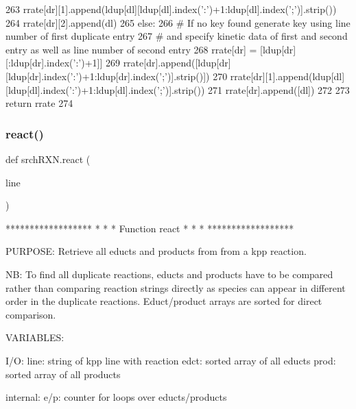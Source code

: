 \begin{DoxyCode}
263         rrate[dr][1].append(ldup[dl][ldup[dl].index(\textcolor{stringliteral}{':'})+1:ldup[dl].index(\textcolor{stringliteral}{';'})].strip())
264         rrate[dr][2].append(dl)
265     \textcolor{keywordflow}{else}:
266 \textcolor{comment}{# If no key found generate key using line number of first duplicate entry}
267 \textcolor{comment}{# and specify kinetic data of first and second entry as well as line number of second entry}
268         rrate[dr] = [ldup[dr][:ldup[dr].index(\textcolor{stringliteral}{':'})+1]]
269         rrate[dr].append([ldup[dr][ldup[dr].index(\textcolor{stringliteral}{':'})+1:ldup[dr].index(\textcolor{stringliteral}{';'})].strip()])
270         rrate[dr][1].append(ldup[dl][ldup[dl].index(\textcolor{stringliteral}{':'})+1:ldup[dl].index(\textcolor{stringliteral}{';'})].strip())
271         rrate[dr].append([dl])
272 
273     \textcolor{keywordflow}{return} rrate
274 
\end{DoxyCode}
\mbox{\label{namespacesrchRXN_a0d86abe53fd006f2f6ec9ea9e613a017}} 
\subsubsection{\texorpdfstring{react()}{react()}}
{\footnotesize\ttfamily def srch\+R\+X\+N.\+react (\begin{DoxyParamCaption}\item[{}]{line }\end{DoxyParamCaption})}

\begin{DoxyVerb}******************
*                *
* Function react *
*                *
******************

PURPOSE:
    Retrieve all educts and products from from a kpp reaction.

NB:
    To find all duplicate reactions, educts and products have to be
    compared rather than comparing reaction strings directly as species
    can appear in different order in the duplicate reactions.
    Educt/product arrays are sorted for direct comparison.

VARIABLES:

I/O:
    line:   string of kpp line with reaction
    edct:   sorted array of all educts
    prod:   sorted array of all products

internal:
    e/p:    counter for loops over educts/products
\end{DoxyVerb}
 
